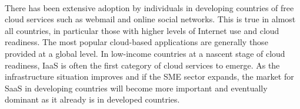 \documentclass[a4paper, UTF8, 12pt]{article}
\begin{document}
\paragraph*{}
    There has been extensive adoption by individuals in developing countries of free cloud services such as webmail and online social networks. This is true in almost all countries, in particular those with higher levels of Internet use and cloud readiness. The most popular cloud-based applications are generally those provided at a global level. In low-income countries at a nascent stage of cloud readiness, IaaS is often the first category of cloud services to emerge. As the infrastructure situation improves and if the SME sector expands, the market for SaaS in developing countries will become more important and eventually dominant as it already is in developed countries.
\end{document}
